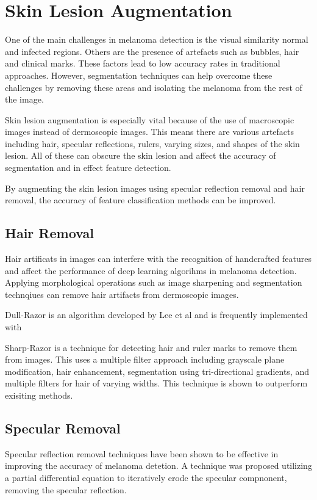 



\section{Skin Lesion Augmentation}
One of the main challenges in melanoma detection is the visual similarity normal and infected regions. Others are the presence of artefacts such as bubbles, hair and clinical marks\cite{Albahli2020}. These factors lead to low accuracy rates in traditional approaches. However, segmentation techniques can help overcome these challenges by removing these areas and isolating the melanoma from the rest of the image.

Skin lesion augmentation is especially vital because of the use of macroscopic images instead of dermoscopic images. This means there are various artefacts including hair, specular reflections, rulers, varying sizes, and shapes of the skin lesion. All of these can obscure the skin lesion and affect the accuracy of segmentation\cite{Unver2019} and in effect feature detection.

By augmenting the skin lesion images using specular reflection removal and hair removal, the accuracy of feature classification methods can be improved\cite{kasmi2023}. 

\subsection{Hair Removal}
Hair artificats in images can interfere with the recognition of handcrafted features and affect the performance of deep learning algorihms in melanoma detection\cite{kasmi2023}. Applying morphological operations such as image sharpening and segmentation technqiues can remove hair artifacts from dermoscopic images\cite{kasmi2023}.

Dull-Razor is an algorithm developed by Lee et al\cite{Lee1997} and is frequently implemented with 

Sharp-Razor\cite{kasmi2023} is a technique for detecting hair and ruler marks to remove them from  images. This uses a multiple filter approach including grayscale plane modification, hair enhancement, segmentation using tri-directional gradients, and multiple filters for hair of varying widths. This technique is shown to outperform exisiting methods.

\subsection{Specular Removal}
Specular reflection removal techniques have been shown to be effective in improving the accuracy of melanoma detetion\cite{Shen2009}. A technique was proposed utilizing a partial differential equation to iteratively erode the specular compnonent, removing the specular reflection\cite{Shen2009}.
